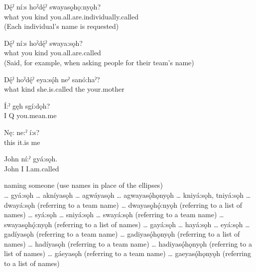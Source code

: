 \ea 
\gll Dę́ˀ ní:s hoˀdę́ˀ swayasǫ̱hǫ:nyǫh?\\
what you kind you.all.are.individually.called\\
\glt {} (Each individual’s name is requested)
\z

\ea 
\gll Dę́ˀ ní:s hoˀdę́ˀ swaya:sǫh?\\
what you kind you.all.are.called\\
\glt {} (Said, for example, when asking people for their team’s name)
\z

\ea 
\gll Dę́ˀ hoˀdę́ˀ eya:sǫ́h neˀ sanó:haˀ?\\
what kind she.is.called the your.mother\\
\glt {}
\z

\ea 
\gll Í:ˀ gęh sgí:dǫh?\\
I Q you.mean.me\\
\glt {}
\z

\ea 
\gll Nę: ne:ˀ í:s?\\
this it.is me\\
\glt {}
\z

\ea 
\gll John ní:ˀ gyá:sǫh.\\
John I I.am.called\\
\glt {}
\z



\ea naming someone (use names in place of the ellipses)\\
\ea … gyá:sǫh 
\ex … akníyasǫh 
\ex … agwáyasǫh 
\ex … agwayasǫ́hǫnyǫh 
\ex … kniyá:sǫh, tniyá:sǫh 
\ex … dwayá:sǫh  (referring to a team name)
\ex … dwayasǫ̱hǫ́:nyǫh  (referring to a list of names)
\ex … syá:sǫh 
\ex … sniyá:sǫh 
\ex … swayá:sǫh  (referring to a team name)
\ex … swayasǫ̱hǫ́:nyǫh  (referring to a list of names)
\ex … gayá:sǫh 
\ex … hayá:sǫh 
\ex … eyá:sǫh 
\ex … gadíyasǫh  (referring to a team name)
\ex … gadiyasǫ́hǫnyǫh  (referring to a list of names)
\ex … hadíyasǫh  (referring to a team name)
\ex … hadiyasǫ́hǫnyǫh  (referring to a list of names)
\ex … gáeyasǫh  (referring to a team name)
\ex … gaeyasǫ́hǫnyǫh  (referring to a list of names)
\z
\z


